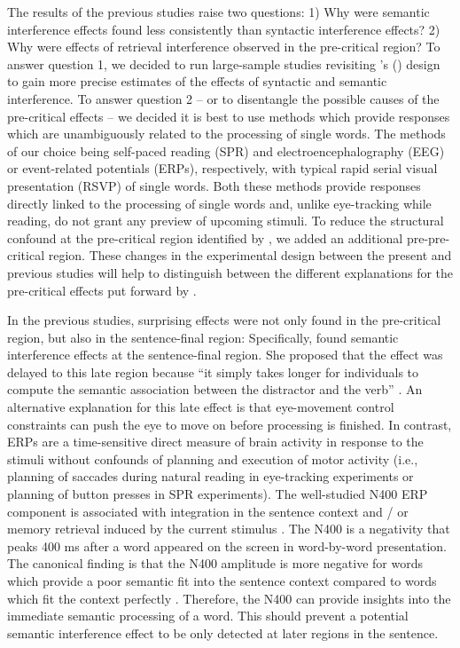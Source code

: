 \documentclass[a4paper, man, floatsintext]{apa7}
\begin{document}
The results of the previous studies raise two questions: 1) Why were semantic interference effects found less consistently than syntactic interference effects? 2) Why were effects of retrieval interference observed in the pre-critical region? To answer question 1, we decided to run large-sample studies revisiting \citeauthor{vandyke07}'s (\citeyear{vandyke07}) design to gain more precise estimates of the effects of syntactic and semantic interference. To answer question 2 -- or to disentangle the possible causes of the pre-critical effects -- we decided it is best to use methods which provide responses which are unambiguously related to the processing of single words. The methods of our choice being self-paced reading (SPR) and electroencephalography (EEG) or event-related potentials (ERPs), respectively, with typical rapid serial visual presentation (RSVP) of single words. Both these methods provide responses directly linked to the processing of single words and, unlike eye-tracking while reading, do not grant any preview of upcoming stimuli. To reduce the structural confound at the pre-critical region identified by \citet{mertzen}, we added an additional pre-pre-critical region. These changes in the experimental design between the present and previous studies will help to distinguish between the different explanations for the pre-critical effects put forward by \citet{mertzen}.

In the previous studies, surprising effects were not only found in the pre-critical region, but also in the sentence-final region: Specifically, \citet{vandyke07} found semantic interference effects at the sentence-final region. She proposed that the effect was delayed to this late region because ``it simply takes longer for individuals to compute the semantic association between the distractor and the verb'' \citep[][p. 427]{vandyke07}. An alternative explanation for this late effect is that eye-movement control constraints can push the eye to move on before processing is finished. In contrast, ERPs are a time-sensitive direct measure of brain activity in response to the stimuli without confounds of planning and execution of motor activity (i.e., planning of saccades during natural reading in eye-tracking experiments or planning of button presses in SPR experiments). The well-studied N400 ERP component is associated with integration in the sentence context and / or memory retrieval induced by the current stimulus \citep{brouwer2017_n4_p6, lau2008_n400, kutas&federmeier_2000, kutas_federmeier2011}. The N400 is a negativity that peaks 400 ms after a word appeared on the screen in word-by-word presentation. The canonical finding is that the N400 amplitude is more negative for words which provide a poor semantic fit into the sentence context compared to words which fit the context perfectly \citep{kutas_hillyard}. Therefore, the N400 can provide insights into the immediate semantic processing of a word. This should prevent a potential semantic interference effect to be only detected at later regions in the sentence. 
\end{document}
